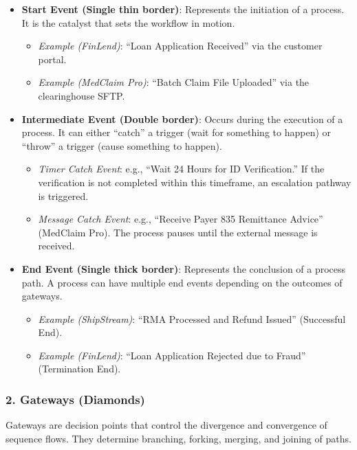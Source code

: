\documentclass[
  11pt,
  openany,
  oneside]{book}
\providecommand{\tightlist}{%
  \setlength{\itemsep}{0pt}\setlength{\parskip}{0pt}}
\begin{document}
\begin{itemize}
\tightlist
\item
  \textbf{Start Event (Single thin border)}: Represents the initiation
  of a process. It is the catalyst that sets the workflow in motion.

  \begin{itemize}
  \tightlist
  \item
    \emph{Example (FinLend)}: ``Loan Application Received'' via the
    customer portal.
  \item
    \emph{Example (MedClaim Pro)}: ``Batch Claim File Uploaded'' via the
    clearinghouse SFTP.
  \end{itemize}
\item
  \textbf{Intermediate Event (Double border)}: Occurs during the
  execution of a process. It can either ``catch'' a trigger (wait for
  something to happen) or ``throw'' a trigger (cause something to
  happen).

  \begin{itemize}
  \tightlist
  \item
    \emph{Timer Catch Event}: e.g., ``Wait 24 Hours for ID
    Verification.'' If the verification is not completed within this
    timeframe, an escalation pathway is triggered.
  \item
    \emph{Message Catch Event}: e.g., ``Receive Payer 835 Remittance
    Advice'' (MedClaim Pro). The process pauses until the external
    message is received.
  \end{itemize}
\item
  \textbf{End Event (Single thick border)}: Represents the conclusion of
  a process path. A process can have multiple end events depending on
  the outcomes of gateways.

  \begin{itemize}
  \tightlist
  \item
    \emph{Example (ShipStream)}: ``RMA Processed and Refund Issued''
    (Successful End).
  \item
    \emph{Example (FinLend)}: ``Loan Application Rejected due to Fraud''
    (Termination End).
  \end{itemize}
\end{itemize}

\subsubsection{2. Gateways (Diamonds)}\label{gateways-diamonds}

Gateways are decision points that control the divergence and convergence
of sequence flows. They determine branching, forking, merging, and
joining of paths.
\end{document}
